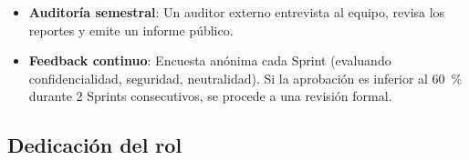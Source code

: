 \begin{itemize}
    \item \textbf{Auditoría semestral}: Un auditor externo entrevista al equipo, revisa los reportes y emite un informe público.
    \item \textbf{Feedback continuo}: Encuesta anónima cada Sprint (evaluando confidencialidad, seguridad, neutralidad). Si la aprobación es inferior al 60~\% durante 2 Sprints consecutivos, se procede a una revisión formal.
\end{itemize}

\subsection{Dedicación del rol}

\begingroup
\scriptsize
\renewcommand{\arraystretch}{1.4}
\setlength{\tabcolsep}{4pt}
\setlength{\LTleft}{0pt}
\setlength{\LTright}{0pt}

